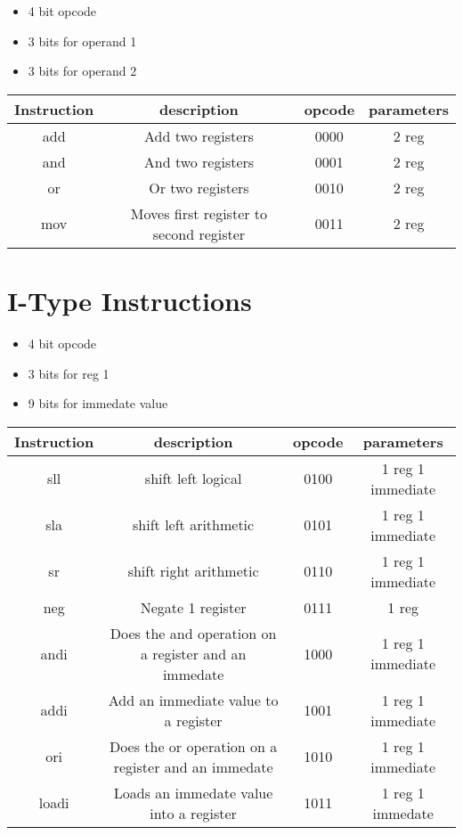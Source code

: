 \documentclass[a4paper]{article}
\begin{document}
\begin{itemize}
\item 4 bit opcode
\item 3 bits for operand 1
\item 3 bits for operand 2
\end{itemize}


\begin{center}
\begin{tabular}{| c | c | c | c |}
\hline
Instruction & description & opcode & parameters \\ \hline
add & Add two registers & 0000 & 2 reg \\ \hline
and & And two registers & 0001 & 2 reg \\ \hline
or & Or two registers & 0010 & 2 reg \\ \hline
mov & Moves first register to second register & 0011 & 2 reg \\ \hline
\end{tabular}
\end{center}

\section{I-Type Instructions}
\begin{itemize}
\item 4 bit opcode
\item 3 bits for reg 1
\item 9 bits for immedate value
\end{itemize}

\begin{center}
\begin{tabular}{| c | c | c | c |}
\hline
Instruction & description & opcode & parameters \\ \hline
sll & shift left logical & 0100 & 1 reg 1 immediate \\ \hline
sla & shift left arithmetic & 0101 & 1 reg 1 immediate \\ \hline
sr & shift right arithmetic & 0110 & 1 reg 1 immediate \\ \hline
neg & Negate 1 register & 0111 & 1 reg \\ \hline
andi & Does the and operation on a register and an immedate & 1000 & 1 reg 1 immediate \\ \hline
addi & Add an immediate value to a register & 1001 & 1 reg 1 immediate \\ \hline
ori & Does the or operation on a register and an immedate & 1010 & 1 reg 1 immediate \\ \hline
loadi & Loads an immedate value into a register & 1011 & 1 reg 1 immedate \\ \hline
\end{tabular}
\end{center}
\end{document}
